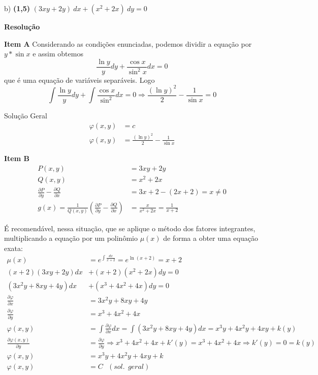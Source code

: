 \documentclass[12pt,openany, letterpaper]{book}
\newcommand{\Resolve}{\begin{center} \textbf{Resolução} \end{center}}
\newcommand{\difff}[2]{\frac{\partial {#1}}{\partial {#2}}}
\begin{document}
{{b) \textbf{(1,5)} $(3xy + 2y)\ dx + (x^2 + 2x)\ dy = 0$

\Resolve

\textbf{Item A} Considerando as condições enunciadas, podemos dividir a equação por $y*\sin x$ e assim obtemos $$ \frac{\ln y}{y}dy + \frac{\cos x}{\sin ^2 x}dx = 0 $$ que é uma equação de variáveis separáveis. Logo $$ \int \frac{\ln y}{y}dy + \int \frac{\cos x}{\sin^2}dx = 0 \Rightarrow \frac{(\ln y)^2}{2} - \frac{1}{\sin x} = 0$$

Solução Geral \begin{align*}
    \varphi (x,y) &= c \\
    \varphi (x,y) &= \frac{(\ln y)^2}{2} - \frac{1}{\sin x}
\end{align*}

\textbf{Item B} \begin{align*}
    P(x,y) &= 3xy + 2y \\
    Q(x,y) &= x^2 + 2x \\
    \difff{P}{y} - \difff{Q}{x} &= 3x +2 - (2x + 2) = x \neq 0 \\
    g(x) = \frac{1}{Q(x,y)}\left(\difff{P}{y} - \difff{Q}{x}\right) &= \frac{x}{x^2 +2x} = \frac{1}{x+2}
\end{align*}

É recomendável, nessa situação, que se aplique o método dos fatores integrantes, multiplicando a equação por um polinômio $\mu(x)$ de forma a obter uma equação exata: \begin{align*}
    \mu(x) &= e^{\int \frac{dx}{x+2}} = e^{\ln (x+2)} = x + 2 \\
    (x+2) (3xy + 2y)dx &+ (x+2) (x^2+2x)dy = 0 \\
    (3x^2y + 8xy + 4y)dx &+ (x^3 + 4x^2 + 4x)dy = 0 \\
    \difff{\varphi}{x} &= 3x^2y + 8xy + 4y \\
    \difff{\varphi}{y} &= x^3 + 4x^2 + 4x \\
    \varphi (x,y) &= \int \difff{\varphi}{x}dx = \int (3x^2y + 8xy + 4y) dx = x^3y + 4x^2y + 4xy + k(y) \\
    \difff{\varphi (x,y)}{y} &= \difff{\varphi}{y} \Rightarrow x^3 + 4x^2 + 4x + k'(y) = x^3 + 4x^2 + 4x \Rightarrow k'(y) = 0 = k(y) \\
    \varphi (x,y) &= x^3y + 4x^2y + 4xy + k\\
    \varphi (x,y) &= C \ \ \ (sol. \ \ geral)
\end{align*}

\newpage

}}
\end{document}
